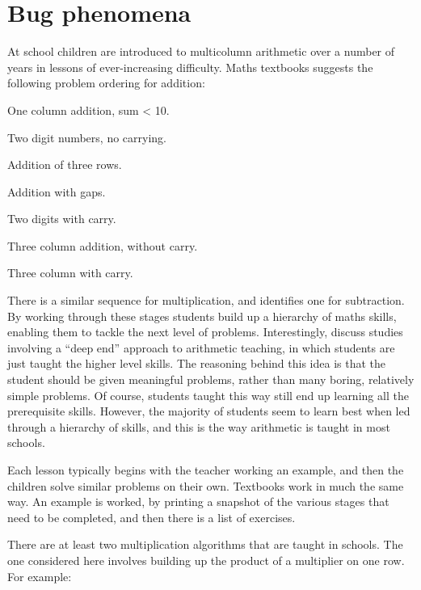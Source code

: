 \section{Bug phenomena}\label{s:bugphen}

At school children are introduced to multicolumn arithmetic over a number
of years in lessons of ever-increasing difficulty.
Maths textbooks \cite{howemath} suggests the following problem ordering
for addition:

\ssadjust
\begin{enumerate}
\begin{singlespace}
\item One column addition, sum < 10.
\item Two digit numbers, no carrying.
\item Addition of three rows.
\item Addition with gaps.
\item Two digits with carry.
\item Three column addition, without carry.
\item Three column with carry.
\end{singlespace}
\end{enumerate}

There is a similar sequence for multiplication, and 
identifies one for subtraction.  By working through these stages students
build up a hierarchy of maths skills, enabling them to tackle the next
level of problems.  Interestingly,  discuss studies
involving a ``deep end'' approach to arithmetic teaching,
in which students are just taught the
higher level skills.  The reasoning behind this idea is that the student
should be given meaningful problems, rather than many boring, relatively
simple problems.  Of course, students taught this way still end up learning
all the prerequisite skills.  However, the majority of students seem to
learn best when led through a hierarchy of skills, and this is the way
arithmetic is taught in most schools.

Each lesson typically begins with the teacher working an example, and then
the children solve similar problems on their own.  Textbooks work in much
the same way.  An example is worked, by printing a snapshot of the various
stages that need to be completed, and then there is a list of exercises.

There are at least two multiplication algorithms that are taught
in schools.  The one considered here involves building up the product of
a multiplier on one row. For example:


